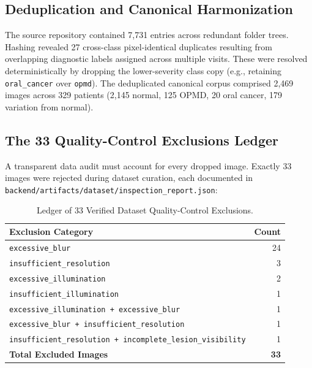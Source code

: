 \documentclass[11pt,a4paper]{report}
\newcommand{\artifact}[1]{\nolinkurl{#1}}
\begin{document}
\subsection{Deduplication and Canonical Harmonization}
The source repository contained 7,731 entries across redundant folder trees. Hashing revealed 27 cross-class pixel-identical duplicates resulting from overlapping diagnostic labels assigned across multiple visits. These were resolved deterministically by dropping the lower-severity class copy (e.g., retaining \texttt{oral\_cancer} over \texttt{opmd}). The deduplicated canonical corpus comprised 2,469 images across 329 patients (2,145 normal, 125 OPMD, 20 oral cancer, 179 variation from normal).

\subsection{The 33 Quality-Control Exclusions Ledger}
A transparent data audit must account for every dropped image. Exactly 33 images were rejected during dataset curation, each documented in \artifact{backend/artifacts/dataset/inspection\_report.json}:
\begin{table}[H]
\centering
\small
\begin{tabular}{lr}
\toprule
\textbf{Exclusion Category} & \textbf{Count} \\
\midrule
\texttt{excessive\_blur} & 24 \\
\texttt{insufficient\_resolution} & 3 \\
\texttt{excessive\_illumination} & 2 \\
\texttt{insufficient\_illumination} & 1 \\
\texttt{excessive\_illumination + excessive\_blur} & 1 \\
\texttt{excessive\_blur + insufficient\_resolution} & 1 \\
\texttt{insufficient\_resolution + incomplete\_lesion\_visibility} & 1 \\
\midrule
\textbf{Total Excluded Images} & \textbf{33} \\
\bottomrule
\end{tabular}
\caption{Ledger of 33 Verified Dataset Quality-Control Exclusions.}
\label{tab:qc_ledger}
\end{table}
\end{document}
